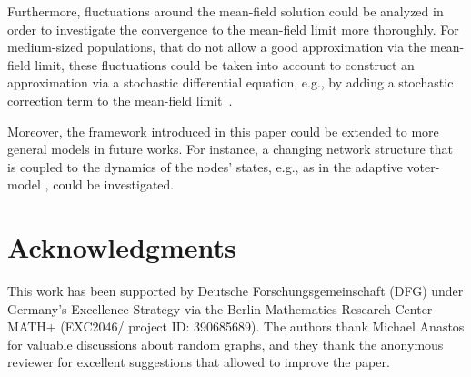\documentclass[a4paper,
               10pt,
               pdftex,
               normalheadings,
               headsepline,
               footsepline,
               headinclude,
               footinclude,
               DIV=14,
               abstracton]
{scrartcl}
\newcommand{\review}[1]{{#1}}
\begin{document}
Furthermore, fluctuations around the mean-field solution could be analyzed in order to investigate the convergence to the mean-field limit more thoroughly. For medium-sized populations, that do not allow a good approximation via the mean-field limit, these fluctuations could be taken into account to construct an approximation via a stochastic differential equation, e.g., by adding a stochastic correction term to the mean-field limit~\cite{Niemann2021}.

Moreover, the framework introduced in this paper could be extended to more general models in future works. For instance, a changing network structure that is coupled to the dynamics of the nodes' states, e.g., as in the adaptive voter-model \cite{PhysRevE.74.056108}, could be investigated.

\section*{Acknowledgments}
This work has been supported by Deutsche Forschungsgemeinschaft (DFG) under
Germany’s Excellence Strategy via the Berlin Mathematics Research Center MATH+ (EXC2046/ project ID: 390685689).
The authors thank Michael Anastos for valuable discussions about random graphs\review{, and they thank the anonymous reviewer for excellent suggestions that allowed to improve the paper.}

\newpage
\appendix
\setcounter{equation}{0}
\renewcommand{\theequation}{A.\arabic{equation}}
\end{document}
